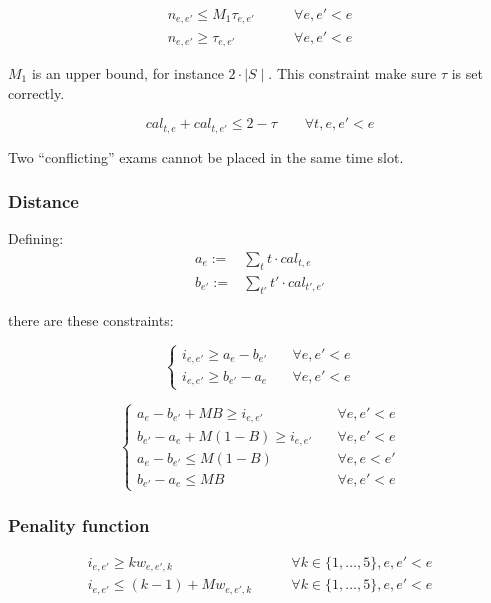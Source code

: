 \documentclass[11pt, a4paper, leqno]{article}
\begin{document}
	\begin{align*}
		n_{e,e'} \leq M_1\tau_{e,e'} &\qquad \forall e,e'<e \\
		n_{e,e'} \geq \tau_{e,e'} &\qquad \forall e,e'<e
	\end{align*}
	
	$M_1$ is an upper bound, for instance $2\cdot\mid S\mid$. This constraint make sure $\tau$ is set correctly.

	\[
		cal_{t,e}+cal_{t,e'} \leq 2 - \tau \qquad \forall t,e,e'<e
	\]
	
	Two ``conflicting'' exams cannot be placed in the same time slot.
	
	\subsubsection{Distance}
	
	Defining:
	\begin{align*}
		a_e :=& \sum_{t} t\cdot cal_{t,e} \\
		b_{e'} :=& \sum_{t'} t'\cdot cal_{t',e'}
	\end{align*}
	
	there are these constraints:
	
	\[
	\begin{cases}
		i_{e,e'} \geq a_e-b_{e'}&\quad \forall e,e'<e\\
		i_{e,e'} \geq b_{e'}-a_e&\quad \forall e,e'<e
	\end{cases}
	\]
	
	
	
	\[
	\begin{cases}
	a_e-b_{e'} + MB \geq i_{e,e'}&\quad \forall e,e'<e\\
	b_{e'}-a_e + M(1-B) \geq i_{e,e'}&\quad \forall e,e'<e\\
	a_e-b_{e'} \leq M(1-B)&\quad \forall e,e<e'\\
	b_{e'}-a_e \leq MB&\quad \forall e,e'<e
	\end{cases}
	\]
	
	\subsubsection{Penality function}
	
	\begin{align*}
		i_{e,e'} \geq k w_{e,e',k} &\qquad\forall k \in \{1,\dots,5\},e,e'<e\\
		i_{e,e'} \leq (k-1) + M  w_{e,e',k} &\qquad\forall k \in \{1,\dots,5\},e,e'<e
	\end{align*}
	
\end{document}
